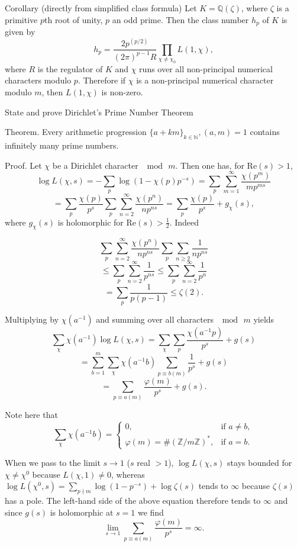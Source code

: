 Corollary (directly from simplified class formula)
Let \(K = \mathbb{Q}(\zeta)\), where \(\zeta\) is a primitive \(p\)th root of unity, \(p\) an odd prime. 
Then the class number \(h_p\) of \(K\) is given by 
\[
h_p = \frac{2p^{(p/2)}}{(2\pi)^{p-1} R} \prod_{\chi \neq \chi_0} L(1, \chi),
\]
where \(R\) is the regulator of \(K\) and \(\chi\) runs over all non-principal numerical characters modulo \(p\).
Therefore if \(\chi\) is a non-principal numerical character modulo \(m\), then \(L(1, \chi)\) is non-zero.


State and prove Dirichlet's Prime Number Theorem

Theorem.
Every arithmetic progression \( \{a + km\}_{k \in \mathbb{N}}, (a, m) = 1  \)
contains infinitely many prime numbers.

Proof. 
Let \(\chi\) be a Dirichlet character \(\mod \, m\). Then one has, for \(\text{Re}(s) > 1\),
\[
\log L(\chi, s) = -\sum_p \log(1 - \chi(p)p^{-s}) = \sum_p \sum_{m=1}^{\infty} \frac{\chi(p^m)}{mp^{ms}} 
\]
\[
= \sum_p \frac{\chi(p)}{p^{s}} \sum_p \sum_{n=2}^{\infty} \frac{\chi(p^n)}{np^{ns}} = \sum_p \frac{\chi(p)}{p^s} + g_{\chi}(s),
\]
where \(g_{\chi}(s)\) is holomorphic for \(\text{Re}(s) > \frac{1}{2}\).
Indeed

\[
 \sum_p \sum_{n=2}^{\infty} \frac{\chi(p^n)}{np^{ns}} \sum_p \sum_{n \geq 2} \frac{1}{np^{ns}}
\]
\[
  \leq \sum_p \sum_{n=2}^{\infty} \frac{1}{p^{ns}} \leq \sum_p \sum_{n=2}^{\infty} \frac{1}{p^n} 
\]
\[
 = \sum_p \frac{1}{p(p-1)} \leq \zeta(2).
\]


Multiplying by \(\chi(a^{-1})\) and summing over all characters \(\mod \, m\) yields
\[
\sum_{\chi} \chi(a^{-1}) \log L(\chi, s) = \sum_{\chi} \sum_p \frac{\chi(a^{-1}p)}{p^s} + g(s)
\]
\[
= \sum_{b=1}^{m} \sum_{\chi} \chi(a^{-1}b) \sum_{p \equiv b (m)} \frac{1}{p^s} + g(s)
\]
\[
= \sum_{p \equiv a (m)} \frac{\varphi(m)}{p^s} + g(s).
\]

Note here that
\[
\sum_{\chi} \chi(a^{-1}b) = 
\begin{cases} 
0, & \text{if } a \neq b, \\
\varphi(m) = \#(\mathbb{Z}/m\mathbb{Z})^{*}, & \text{if } a = b.
\end{cases}
\]

When we pass to the limit \( s \to 1 \) (\(s\) real \(> 1\)), \(\log L(\chi, s)\) stays bounded for \(\chi \neq \chi^0\) because \(L(\chi, 1) \neq 0\), whereas \(\log L(\chi^0, s) = \sum_{p \nmid m} \log(1 - p^{-s}) + \log \zeta(s) \) tends to \( \infty \) because \(\zeta(s)\) has a pole. 
The left-hand side of the above equation therefore tends to \(\infty\) and since \(g(s)\) is holomorphic at \(s = 1\) we find
\[
\lim_{s \to 1} \sum_{p \equiv a (m)} \frac{\varphi(m)}{p^s} = \infty.
\]

